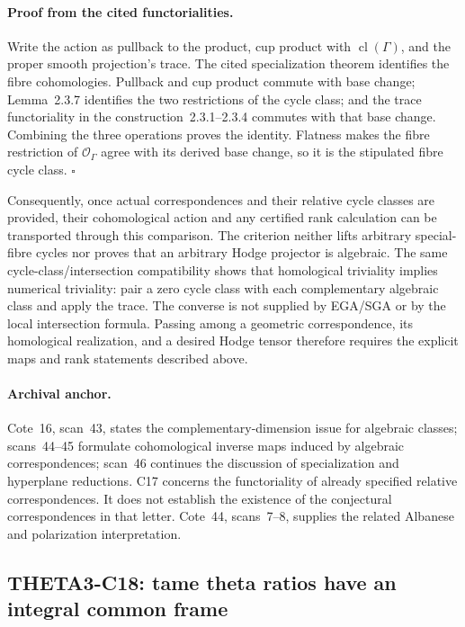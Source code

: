 \documentclass[11pt]{article}
\theoremstyle{definition}\newtheorem{definition}[theorem]{Definition}\newtheorem{remark}[theorem]{Remark}
\begin{document}
\paragraph{Proof from the cited functorialities.}
Write the action as pullback to the product, cup product with
$\operatorname{cl}(\Gamma)$, and the proper smooth projection's
trace. The cited specialization theorem identifies the fibre
cohomologies. Pullback and cup product commute with base change;
Lemma~2.3.7 identifies the two restrictions of the cycle class;
and the trace functoriality in the construction~2.3.1--2.3.4
commutes with that base change. Combining the three operations
proves the identity. Flatness makes the fibre restriction of
$\mathcal O_\Gamma$ agree with its derived base change, so it is
the stipulated fibre cycle class. $\square$

Consequently, once actual correspondences and their relative cycle
classes are provided, their cohomological action and any certified
rank calculation can be transported through this comparison. The
criterion neither lifts arbitrary special-fibre cycles nor proves
that an arbitrary Hodge projector is algebraic. The same
cycle-class/intersection compatibility shows that homological
triviality implies numerical triviality: pair a zero cycle class
with each complementary algebraic class and apply the trace.
The converse is not supplied by EGA/SGA or by the local
intersection formula. Passing among a geometric correspondence,
its homological realization, and a desired Hodge tensor therefore
requires the explicit maps and rank statements described above.

\paragraph{Archival anchor.}
Cote~16, scan~43, states the complementary-dimension issue for algebraic
classes; scans~44--45 formulate cohomological inverse maps induced by
algebraic correspondences; scan~46 continues the discussion of
specialization and hyperplane reductions.  C17 concerns the functoriality
of already specified relative correspondences.  It does not establish the
existence of the conjectural correspondences in that letter.  Cote~44,
scans~7--8, supplies the related Albanese and polarization interpretation.


\subsection{THETA3-C18: tame theta ratios have an integral common frame}\label{C18}
\end{document}
